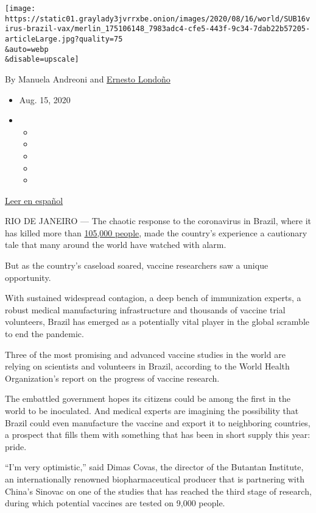 \texttt{[image: https://static01.graylady3jvrrxbe.onion/images/2020/08/16/world/SUB16virus-brazil-vax/merlin\_175106148\_7983adc4-cfe5-443f-9c34-7dab22b57205-articleLarge.jpg?quality=75\\\&auto=webp\\\&disable=upscale]}

By Manuela Andreoni and
\href{https://www.nytimes3xbfgragh.onion/by/ernesto-londono}{Ernesto
Londoño}

\begin{itemize}
\item
  Aug. 15, 2020
\item
  \begin{itemize}
  \item
  \item
  \item
  \item
  \item
  \end{itemize}
\end{itemize}

\href{https://www.nytimes3xbfgragh.onion/es/2020/08/17/espanol/america-latina/vacuna-coronavirus-brasil.html}{Leer
en español}

RIO DE JANEIRO --- The chaotic response to the coronavirus in Brazil,
where it has killed more than \href{https://covid.saude.gov.br/}{105,000
people}, made the country's experience a cautionary tale that many
around the world have watched with alarm.

But as the country's caseload soared, vaccine researchers saw a unique
opportunity.

With sustained widespread contagion, a deep bench of immunization
experts, a robust medical manufacturing infrastructure and thousands of
vaccine trial volunteers, Brazil has emerged as a potentially vital
player in the global scramble to end the pandemic.

Three of the most promising and advanced vaccine studies in the world
are relying on scientists and volunteers in Brazil, according to the
World Health Organization's report on the progress of vaccine research.

The embattled government hopes its citizens could be among the first in
the world to be inoculated. And medical experts are imagining the
possibility that Brazil could even manufacture the vaccine and export it
to neighboring countries, a prospect that fills them with something that
has been in short supply this year: pride.

``I'm very optimistic,'' said Dimas Covas, the director of the Butantan
Institute, an internationally renowned biopharmaceutical producer that
is partnering with China's Sinovac on one of the studies that has
reached the third stage of research, during which potential vaccines are
tested on 9,000 people.

